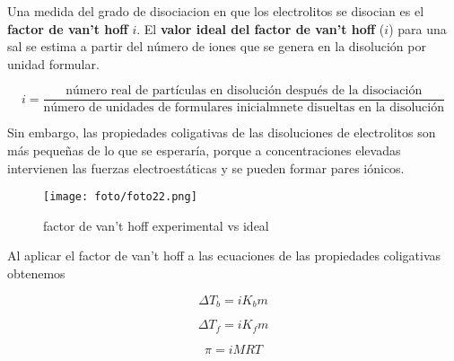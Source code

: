 \documentclass[]{article}
\begin{document}
Una medida del grado de disociacion en que los electrolitos se disocian es el \textbf{factor de van't hoff} $i$. El \textbf{valor ideal del factor de van't hoff} ($i$) para una sal se estima a partir del número de iones que se genera en la disolución por unidad formular.

\begin{equation}
i=\frac{\text{número real de partículas en disolución después de la disociación}}{\text{número de unidades de formulares inicialmnete disueltas en la disolución}}
\end{equation}

Sin embargo, las propiedades coligativas de las disoluciones de electrolitos son más pequeñas de lo que se esperaría, porque a concentraciones elevadas intervienen las fuerzas electroestáticas y se pueden formar pares iónicos.

\begin{figure}[H]
\center
\texttt{[image: foto/foto22.png]}
\caption{factor de van't hoff experimental vs ideal}
\end{figure}

Al aplicar el factor de van't hoff a las ecuaciones de las propiedades coligativas obtenemos

\begin{equation}
\Delta T_{b}=iK_{b}m
\end{equation}

\begin{equation}
\Delta T_{f}=iK_{f}m
\end{equation}

\begin{equation}
\pi = iMRT
\end{equation}
\end{document}
